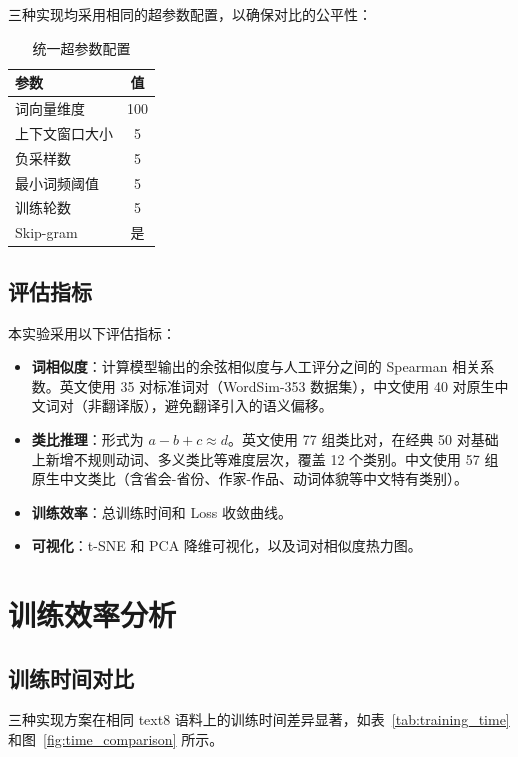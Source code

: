 三种实现均采用相同的超参数配置，以确保对比的公平性：

\begin{table}[htbp]
\centering
\caption{统一超参数配置}
\label{tab:hyperparams}
\begin{tabular}{lc}
\toprule
\textbf{参数} & \textbf{值} \\
\midrule
词向量维度 & 100 \\
上下文窗口大小 & 5 \\
负采样数 & 5 \\
最小词频阈值 & 5 \\
训练轮数 & 5 \\
Skip-gram & 是 \\
\bottomrule
\end{tabular}
\end{table}

\subsection{评估指标}

本实验采用以下评估指标：

\begin{itemize}
  \item \textbf{词相似度}：计算模型输出的余弦相似度与人工评分之间的 Spearman 相关系数。英文使用 35 对标准词对（WordSim-353 数据集），中文使用 40 对原生中文词对（非翻译版），避免翻译引入的语义偏移。
  \item \textbf{类比推理}：形式为 $a - b + c \approx d$。英文使用 77 组类比对，在经典 50 对基础上新增不规则动词、多义类比等难度层次，覆盖 12 个类别。中文使用 57 组原生中文类比（含省会-省份、作家-作品、动词体貌等中文特有类别）。
  \item \textbf{训练效率}：总训练时间和 Loss 收敛曲线。
  \item \textbf{可视化}：t-SNE 和 PCA 降维可视化，以及词对相似度热力图。
\end{itemize}

\section{训练效率分析}

\subsection{训练时间对比}

三种实现方案在相同 text8 语料上的训练时间差异显著，如表~\ref{tab:training_time} 和图~\ref{fig:time_comparison} 所示。

